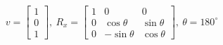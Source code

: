\documentclass[preview]{standalone}
\begin{document}
\begin{align*}
v = \begin{bmatrix}
                        1\\
                        0\\
                        1
                        \end{bmatrix}, \ 
                        R_x = \begin{bmatrix}
                        1 & 0 & 0\\
                        0 & \cos \theta  & \sin \theta \\
                        0 & -\sin \theta  & \cos \theta 
                        \end{bmatrix}, \ 
                        \theta = 180^\circ
\end{align*}
\end{document}
